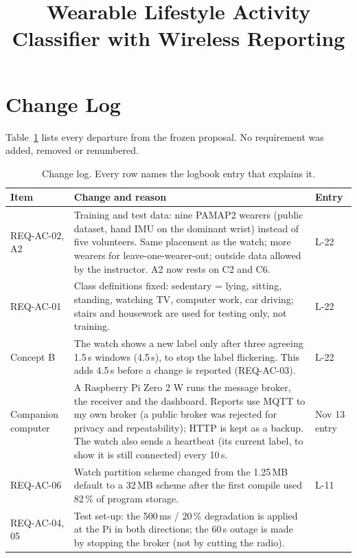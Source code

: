 \documentclass[conference]{IEEEtran}
\title{Wearable Lifestyle Activity Classifier with Wireless Reporting}
\author{
\IEEEauthorblockN{Kenneth Dialogo}
\IEEEauthorblockA{247-519-VA Project I -- Stage 1 Concept and Feasibility Report\\
Vanier College, November 20, 2026}
}
\begin{document}
\maketitle

\section{Change Log}
\label{sec:changes}

Table~\ref{tab:changes} lists every departure from the frozen
proposal. No requirement was added, removed or renumbered.

\begin{table}[H]
\centering
\scriptsize
\setlength{\tabcolsep}{3pt}
\caption{Change log. Every row names the logbook entry that explains it.}
\label{tab:changes}
\begin{tabular}{p{1.35cm}p{5.65cm}p{0.85cm}}
\toprule
\textbf{Item} & \textbf{Change and reason} & \textbf{Entry} \\
\midrule
REQ-AC-02, A2 & Training and test data: nine PAMAP2 wearers
(public dataset, hand IMU on the dominant wrist) instead of five
volunteers. Same placement as the watch; more wearers for
leave-one-wearer-out; outside data allowed by the instructor. A2 now rests on C2 and C6. &
L-22 \\
REQ-AC-01 & Class definitions fixed: sedentary = lying, sitting,
standing, watching TV, computer work, car driving; stairs and
housework are used for testing only, not training. &
L-22 \\
Concept B & The watch shows a new label only after three agreeing
1.5\,s windows (4.5\,s), to stop the label flickering. This adds
4.5\,s before a change is reported (REQ-AC-03). &
L-22 \\
Companion computer & A Raspberry Pi Zero 2 W runs the message
broker, the receiver and the dashboard. Reports use MQTT to my own
broker (a public broker was rejected for privacy and
repeatability); HTTP is kept as a backup. The watch also sends a heartbeat (its current label, to show it is still connected) every 10\,s. &
Nov 13 entry \\
REQ-AC-06 & Watch partition scheme changed from the 1.25\,MB default
to a 32\,MB scheme after the first compile used 82\,\% of program
storage. &
L-11 \\
REQ-AC-04, 05 & Test set-up: the 500\,ms / 20\,\% degradation is
applied at the Pi in both directions; the 60\,s outage is made by
stopping the broker (not by cutting the radio). &

\end{tabular}
\end{table}
\end{document}
